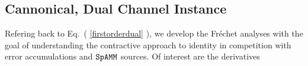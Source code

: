 \documentclass[letterpaper,twocolumn,amsmath,amsfont,amssymb,english,aps,jcp,preprintnumbers,groupaddress,nofootinbib,tightenlines,floatfix]{revtex4}
\newcommand{\mat}[1]{\boldsymbol{#1}}
\theoremstyle{plain}
\theoremstyle{remark}
\theoremstyle{plain}
\begin{document}
\subsection{Cannonical, Dual Channel Instance}
 
Refering back to Eq.~( \ref{firstorderdual} ), we develop the Fr\'{e}chet analyses \cite{} with the goal of understanding
the contractive approach to identity in competition with error accumulations and $\tt SpAMM$ sources.
Of interest are the derivatives 



\end{document}
